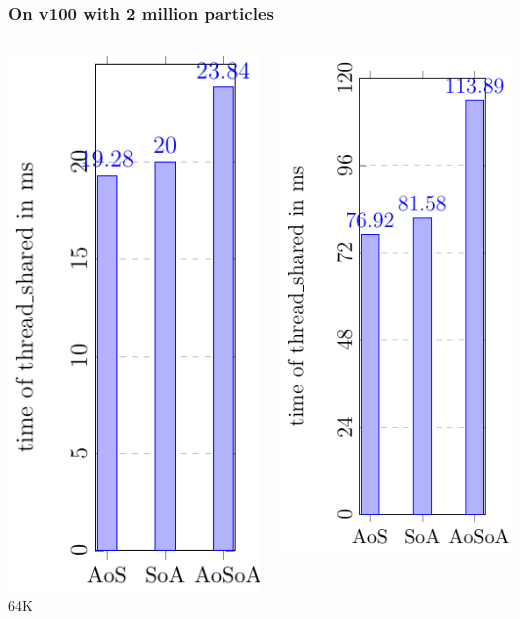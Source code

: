 \documentclass[aspectratio=169]{beamer}
\begin{document}
\begin{frame}
	\frametitle{On v100 with 2 million particles}
	\begin{columns}
	\begin{column}{0.25\textwidth}
	\includegraphics[scale=0.55]{figures/fig30.pdf}
	\small 64K
	\end{column}
	\begin{column}{0.25\textwidth}
	\includegraphics[scale=0.55]{figures/fig40.pdf}

\end{column}
\end{columns}
\end{frame}
\end{document}
